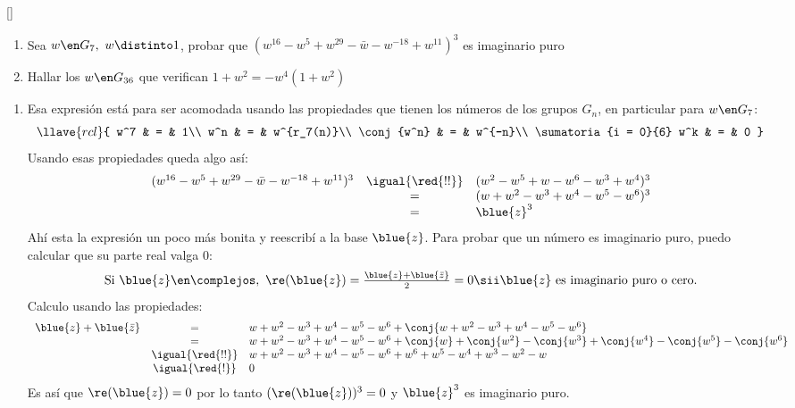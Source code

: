 \begin{enunciado}{\ejExtra}{\tiny[]}
  \begin{enumerate}[label=(\alph*)]
    \item Sea $w \en G_7, ~ w \distinto 1$, probar que
          $(w^{16} - w^5 + w^{29} - \bar{w} - w^{-18} + w^{11})^3$
          es imaginario puro

    \item Hallar los $w \en G_{36}$ que verifican $1 + w^2 = - w^4(1 + w^2)$
  \end{enumerate}
\end{enunciado}

\begin{enumerate}[label=(\alph*)]
  \item Esa expresión está para ser acomodada usando las propiedades que tienen los números de los grupos $G_n$,
        en particular para $w \en G_7$:
        $$
          \llave{rcl}{
            w^7 & = & 1\\
            w^n & = & w^{r_7(n)}\\
            \conj{w^n} & = & w^{-n}\\
            \sumatoria{i = 0}{6} w^k & = & 0
          }
        $$
        Usando esas propiedades queda algo así:
        $$
          \begin{array}{rcl}
            (w^{16} - w^5 + w^{29} - \bar{w} - w^{-18} + w^{11})^3
             & \igual{\red{!!}} &
            (w^2 - w^5 + w - w^6 - w^3 + w^4)^3 \\
             & =                &
            (w + w^2 - w^3 + w^4 - w^5 - w^6)^3 \\
             & =                &
            \blue{z}^3                          \\
          \end{array}
        $$
        Ahí esta la expresión un poco más bonita y reescribí a la base $\blue{z}$. Para probar que un número es imaginario puro,
        puedo calcular que su parte real valga 0:
        $$
          \textstyle
          \text{Si } \blue{z} \en \complejos,~ \re(\blue{z}) = \frac{\blue{z} + \blue{\bar{z}}}{2} = 0
          \sii
          \blue{z} \text{ es imaginario puro o cero}.
        $$
        Calculo usando las propiedades:
        $$
          \begin{array}{rcl}
            \blue{z} + \blue{\bar{z}}
             & =                &
            w + w^2 - w^3 + w^4 - w^5 - w^6 + \conj{w + w^2 - w^3 + w^4 - w^5 - w^6}                                    \\
             & =                &
            w + w^2 - w^3 + w^4 - w^5 - w^6 + \conj{w} + \conj{w^2} - \conj{w^3} + \conj{w^4} - \conj{w^5} - \conj{w^6} \\
             & \igual{\red{!!}} &
            w + w^2 - w^3 + w^4 - w^5 - w^6 + w^6 + w^5 - w^4 + w^3 - w^2 - w                                           \\
             & \igual{\red{!}}  &
            0
          \end{array}
        $$
        Es así que $\re(\blue{z}) = 0$ por lo tanto $(\re(\blue{z}))^3 = 0$ y $\blue{z}^3$ es imaginario puro.


\end{enumerate}
